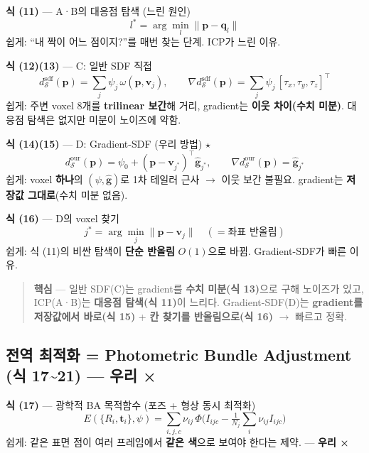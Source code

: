 \textbf{식 (11)} --- A·B의 대응점 탐색 (느린 원인)
\begin{equation*}
  l^* = \arg\min_l \lVert \mathbf{p}-\mathbf{q}_l\rVert
  \tag{11}
\end{equation*}
쉽게: ``내 짝이 어느 점이지?''를 매번 찾는 단계. ICP가 느린 이유.

\textbf{식 (12)(13)} --- C: 일반 SDF 직접
\begin{equation*}
  d_{\mathcal{S}}^{\text{sdf}}(\mathbf{p})
    = \sum_j \psi_j\,\omega(\mathbf{p},\mathbf{v}_j), \qquad
  \nabla d_{\mathcal{S}}^{\text{sdf}}(\mathbf{p})
    = \sum_j \psi_j\,[\tau_x,\tau_y,\tau_z]^{\top}
  \tag{12, 13}
\end{equation*}
쉽게: 주변 voxel 8개를 \textbf{trilinear 보간}해 거리, gradient는 \textbf{이웃
차이(수치 미분)}. 대응점 탐색은 없지만 미분이 노이즈에 약함.

\textbf{식 (14)(15)} --- D: Gradient-SDF (우리 방법) $\star$
\begin{equation*}
  d_{\mathcal{S}}^{\text{our}}(\mathbf{p})
    = \psi_0 + (\mathbf{p}-\mathbf{v}_{j^*})^{\top}\hat{\mathbf{g}}_{j^*}, \qquad
  \nabla d_{\mathcal{S}}^{\text{our}}(\mathbf{p}) = \hat{\mathbf{g}}_{j^*}
  \tag{14, 15}
\end{equation*}
쉽게: voxel \textbf{하나}의 $(\psi,\hat{\mathbf{g}})$로 1차 테일러 근사 $\to$
이웃 보간 불필요. gradient는 \textbf{저장값 그대로}(수치 미분 없음).

\textbf{식 (16)} --- D의 voxel 찾기
\begin{equation*}
  j^* = \arg\min_j \lVert \mathbf{p}-\mathbf{v}_j\rVert
  \quad (=\text{좌표 반올림})
  \tag{16}
\end{equation*}
쉽게: 식 (11)의 비싼 탐색이 \textbf{단순 반올림} $O(1)$으로 바뀜. Gradient-SDF가
빠른 이유.

\begin{quote}
  \small\textbf{핵심} --- 일반 SDF(C)는 gradient를 \textbf{수치 미분(식
  13)}으로 구해 노이즈가 있고, ICP(A·B)는 \textbf{대응점 탐색(식 11)}이
  느리다. Gradient-SDF(D)는 \textbf{gradient를 저장값에서 바로(식 15)} +
  \textbf{칸 찾기를 반올림으로(식 16)} $\to$ 빠르고 정확.
\end{quote}

\subsection{전역 최적화 = Photometric Bundle Adjustment (식
17\textasciitilde 21) --- 우리 ×}

\textbf{식 (17)} --- 광학적 BA 목적함수 (포즈 + 형상 동시 최적화)
\begin{equation*}
  E(\{R_i,\mathbf{t}_i\},\psi)
  = \sum_{i,j,c} \nu_{ij}\,
    \Phi\!\Big(I_{ijc} - \tfrac{1}{N_j}\textstyle\sum_i \nu_{ij} I_{ijc}\Big)
  \tag{17}
\end{equation*}
쉽게: 같은 표면 점이 여러 프레임에서 \textbf{같은 색}으로 보여야 한다는 제약.
--- \textbf{우리 ×}

